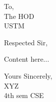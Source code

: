 \documentclass{letter}
\date{26.04.25}
\begin{document}
\begin{letter}{To, \\ The HOD \\ USTM}
\opening{Respected Sir,}
Content here...
\closing{Yours Sincerely, \\ XYZ \\ 4th sem CSE}
\end{letter}
\end{document}
